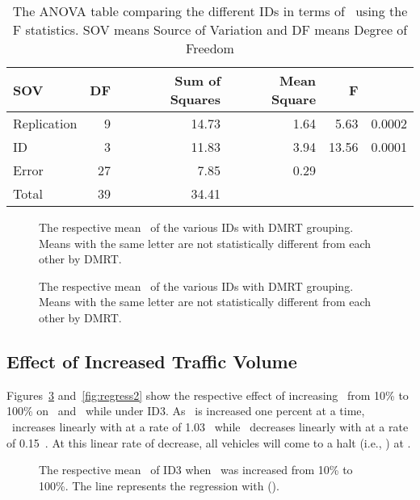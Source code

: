 \documentclass[preprint]{./acm_proc_article-sp}
\begin{document}
\begin{table*}[bth]
\caption{The ANOVA table comparing the different IDs in terms of~ using the F statistics. SOV means Source of Variation and DF means Degree of Freedom}\label{tab:anova-speed}
\centering\begin{tabular}{lrrrrr}
\hline\hline
SOV & DF & Sum of Squares & Mean Square & F & \\
\hline
Replication            &  9 & 14.73 & 1.64 &  5.63 & 0.0002 \\
ID                     &  3 & 11.83 & 3.94 & 13.56 &  0.0001 \\
Error                  & 27 &  7.85 & 0.29 & \\
\hline
Total                  & 39 & 34.41 & \\
\hline\hline
\end{tabular}
\end{table*}

\begin{figure}[bth]
\centering{}
\caption{The respective mean~ of the various IDs with DMRT grouping. Means with the same letter are not statistically different from each other by DMRT.}\label{fig:dmrt1}
\end{figure}

\begin{figure}[bth]
\centering{}
\caption{The respective mean~ of the various IDs with DMRT grouping. Means with the same letter are not statistically different from each other by DMRT.}\label{fig:dmrt2}
\end{figure}

\subsection{Effect of Increased Traffic Volume}

Figures~\ref{fig:regress1} and~\ref{fig:regress2} show the respective effect of increasing~ from 10\% to 100\% on~ and~ while under ID3. As~  is increased one percent at a time, ~increases linearly with  at a rate of 1.03~ while ~decreases linearly with  at a rate of 0.15~. At this linear rate of decrease, all vehicles will come to a halt (i.e., ) at .

\begin{figure}[bth]
\centering{}
\caption{The respective mean~ of ID3 when~ was increased from 10\% to 100\%. The line represents the regression with  ().}\label{fig:regress1}
\end{figure}
\end{document}
